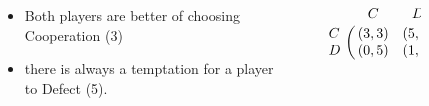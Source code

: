 \documentclass[usenames,dvipsnames,t]{beamer}
\begin{document}
\begin{columns}
    \begin{column}{.1\linewidth}
    \end{column}
    \begin{column}{.2\linewidth}
        \vspace{1.1cm}

        \begin{itemize}
            \item Both players are better of choosing Cooperation (3)
            \item there is always a temptation for a player to Defect (5).
        \end{itemize}
    \end{column}
    \begin{column}{.09\linewidth}
    \end{column}
    \begin{column}{.17\linewidth}
        \vspace{0.1cm}

        \large{
        \begin{equation}\label{eq:payoff_matrix}
             \bordermatrix{~ & C & D \cr
                              C & (3, 3) & (5, 0) \cr
                              D & (0, 5) & (1, 1) \cr}
            \end{equation}}
    \end{column}
    \begin{column}{.09\linewidth}
    \end{column}
    \begin{column}{.3\linewidth}
        \begin{center}
            
        \end{center}
    \end{column}
    \begin{column}{.1\linewidth}
    \end{column}
\end{columns}
\vspace{0.7cm}
\end{document}
